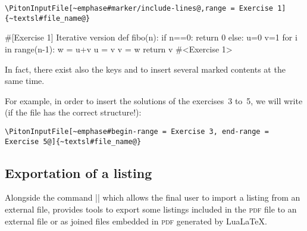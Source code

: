 \documentclass{article}
\begin{document}
\begin{Verbatim}
\PitonInputFile[~emphase#marker/include-lines@,range = Exercise 1]{~textsl#file_name@}
\end{Verbatim}

\begin{Piton}
#[Exercise 1] Iterative version
def fibo(n):
    if n==0: return 0 
    else:
        u=0
        v=1
        for i in range(n-1):
            w = u+v
            u = v
            v = w
        return v
#<Exercise 1>
\end{Piton}


\bigskip
{}
In fact, there exist also the keys  and
 to insert several marked contents at the same time.

For example, in order to insert the solutions of the exercises~3 to~5, we will
write (if the file has the correct structure!):


\begin{Verbatim}
\PitonInputFile[~emphase#begin-range = Exercise 3, end-range = Exercise 5@]{~textsl#file_name@}
\end{Verbatim}


\subsection{Exportation of a listing}

Alongside the command |\PitonInputFile| which allows the final user to import a
listing from an external file,  provides tools to export some listings
included in the \textsc{pdf} file to an external file or as joined files embedded in
\textsc{pdf} generated by LuaLaTeX.
\end{document}
